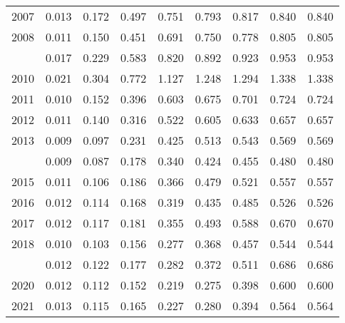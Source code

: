 \documentclass[
]{article}
\begin{document}
\begin{longtable}[t]{lrrrrrrrr}
2007 & 0.013 & 0.172 & 0.497 & 0.751 & 0.793 & 0.817 & 0.840 & 0.840\\
2008 & 0.011 & 0.150 & 0.451 & 0.691 & 0.750 & 0.778 & 0.805 & 0.805\\
\addlinespace
2009 & 0.017 & 0.229 & 0.583 & 0.820 & 0.892 & 0.923 & 0.953 & 0.953\\
2010 & 0.021 & 0.304 & 0.772 & 1.127 & 1.248 & 1.294 & 1.338 & 1.338\\
2011 & 0.010 & 0.152 & 0.396 & 0.603 & 0.675 & 0.701 & 0.724 & 0.724\\
2012 & 0.011 & 0.140 & 0.316 & 0.522 & 0.605 & 0.633 & 0.657 & 0.657\\
2013 & 0.009 & 0.097 & 0.231 & 0.425 & 0.513 & 0.543 & 0.569 & 0.569\\
\addlinespace
2014 & 0.009 & 0.087 & 0.178 & 0.340 & 0.424 & 0.455 & 0.480 & 0.480\\
2015 & 0.011 & 0.106 & 0.186 & 0.366 & 0.479 & 0.521 & 0.557 & 0.557\\
2016 & 0.012 & 0.114 & 0.168 & 0.319 & 0.435 & 0.485 & 0.526 & 0.526\\
2017 & 0.012 & 0.117 & 0.181 & 0.355 & 0.493 & 0.588 & 0.670 & 0.670\\
2018 & 0.010 & 0.103 & 0.156 & 0.277 & 0.368 & 0.457 & 0.544 & 0.544\\
\addlinespace
2019 & 0.012 & 0.122 & 0.177 & 0.282 & 0.372 & 0.511 & 0.686 & 0.686\\
2020 & 0.012 & 0.112 & 0.152 & 0.219 & 0.275 & 0.398 & 0.600 & 0.600\\
2021 & 0.013 & 0.115 & 0.165 & 0.227 & 0.280 & 0.394 & 0.564 & 0.564\\*
\end{longtable}
\end{document}
